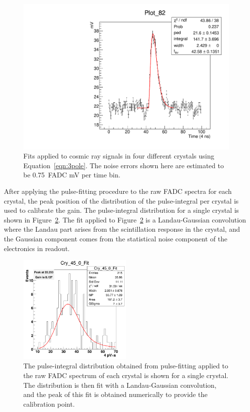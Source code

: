 \documentclass[twoside]{article}
\begin{document}
\begin{figure}[H]
\begin{minipage}{0.5\textwidth}
\end{minipage}\hfill\begin{minipage}{0.5\textwidth}
 \includegraphics[width=\textwidth]{pics/rawfit4.pdf}
 \end{minipage}
  \caption{Fits applied to cosmic ray signals in four different crystals using Equation~\eqref{eqn:3pole}. The noise errors shown here are estimated to be 0.75~FADC mV per time bin.}
  \label{fig:rawFits}
\end{figure}
After applying the pulse-fitting procedure to the raw FADC spectra for each crystal, the peak position of the distribution of the pulse-integral per crystal is used to calibrate the gain. The pulse-integral distribution for a single crystal is shown in Figure~\ref{pulseIntFit}. The fit applied to Figure~\ref{pulseIntFit} is a Landau-Gaussian convolution where the Landau part arises from the scintillation response in the crystal, and the Gaussian component comes from the statistical noise component of the electronics in readout. 
\begin{figure}[htb]
  \centering
      \includegraphics[width=0.5\textwidth]{pics/Cry_45_0_Fit.png}
  \caption{The pulse-integral distribution obtained from pulse-fitting applied to the raw FADC spectrum of each crystal is shown for a single crystal. The distribution is then fit with a Landau-Gaussian convolution, and the peak of this fit is obtained numerically to provide the calibration point.}
  \label{pulseIntFit}
\end{figure}	
\end{document}
